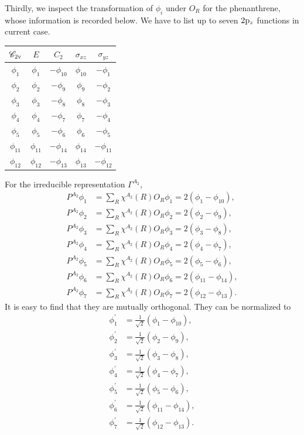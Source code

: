 \documentclass[a4paper]{book}
\newcommand{\orb}[1]{{\rm #1}}
\newcommand{\orbp}{\orb{p}}
\begin{document}
\begin{solution}
\begin{enumerate}[label=(\alph*)]
		Thirdly, we inspect the transformation of $\phi_i$ under $O_R$ for the phenanthrene, whose information is recorded below. We have to list up to seven $2 \orbp_z$ functions in current case.
		\begin{center}
		\begin{tabular}{ccccc}\hline
	$\mathscr{C}_{\rm 2v}$ & $E$ & $C_2$ &	$\sigma_{xz}$	& $\sigma_{yz}$	\\ \hline
			$\phi_1$	&	$\phi_1$	&	$-\phi_{10}$	&	$\phi_{10}$	&	$-\phi_1$	\\
			$\phi_2$	&	$\phi_2$	&	$-\phi_9$	&	$\phi_9$	&	$-\phi_2$		\\
			$\phi_3$	&	$\phi_3$	&	$-\phi_8$	&	$\phi_8$	&	$-\phi_3$		\\
			$\phi_4$	&	$\phi_4$	&	$-\phi_7$	&	$\phi_7$	&	$-\phi_4$		\\ 
			$\phi_5$	&	$\phi_5$	&	$-\phi_6$	&	$\phi_6$	&	$-\phi_5$		\\ 
			$\phi_{11}$	&	$\phi_{11}$	&	$-\phi_{14}$	&	$\phi_{14}$	&	$-\phi_{11}$		\\
			$\phi_{12}$	&	$\phi_{12}$	&	$-\phi_{13}$	&	$\phi_{13}$	&	$-\phi_{12}$		\\ \hline
		\end{tabular}
		\end{center}
		
		For the irreducible representation $\Gamma^{A_2}$,
		\begin{align*}
		P^{A_2}\phi_1 &= \sum_{R} \chi^{A_2}(R) O_R \phi_1 = 2(\phi_1-\phi_{10}) , \\
		P^{A_2}\phi_2 &= \sum_{R} \chi^{A_2}(R) O_R \phi_2 = 2(\phi_2-\phi_9) ,	\\
		P^{A_2}\phi_3 &= \sum_{R} \chi^{A_2}(R) O_R \phi_3 = 2(\phi_3-\phi_8) ,	\\
		P^{A_2}\phi_4 &= \sum_{R} \chi^{A_2}(R) O_R \phi_4 = 2(\phi_4-\phi_7) ,	\\
		P^{A_2}\phi_5 &= \sum_{R} \chi^{A_2}(R) O_R \phi_5 = 2(\phi_5-\phi_6) ,	\\
		P^{A_2}\phi_6 &= \sum_{R} \chi^{A_2}(R) O_R \phi_6 = 2(\phi_{11}-\phi_{14}) ,	\\
		P^{A_2}\phi_7 &= \sum_{R} \chi^{A_2}(R) O_R \phi_7 = 2(\phi_{12}-\phi_{13}) .
		\end{align*}
		It is easy to find that they are mutually orthogonal. They can be normalized to
		\begin{align*}
		\phi^\prime_1 &= \frac{1}{\sqrt{2}} (\phi_1-\phi_{10}) , \\
		\phi^\prime_2 &= \frac{1}{\sqrt{2}} (\phi_2-\phi_9) , \\
		\phi^\prime_3 &= \frac{1}{\sqrt{2}} (\phi_3-\phi_8) , \\
		\phi^\prime_4 &= \frac{1}{\sqrt{2}} (\phi_4-\phi_7) , \\
		\phi^\prime_5 &= \frac{1}{\sqrt{2}} (\phi_5-\phi_6) , \\
		\phi^\prime_6 &= \frac{1}{\sqrt{2}} (\phi_{11}-\phi_{14}) , \\		
		\phi^\prime_7 &= \frac{1}{\sqrt{2}} (\phi_{12}-\phi_{13}) .
		\end{align*}
		

\end{enumerate}
\end{solution}
\end{document}
